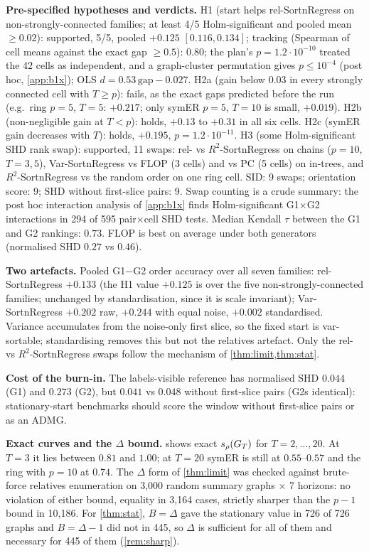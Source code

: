 \textbf{Pre-specified hypotheses and verdicts.}
H1 (start helps rel-SortnRegress on non-strongly-connected families; at least
4/5 Holm-significant and pooled mean $\ge0.02$): supported, 5/5, pooled
$+0.125$ $[0.116,0.134]$; tracking (Spearman of cell means against the exact
gap $\ge0.5$): $0.80$; the plan's $p=1.2\cdot10^{-10}$ treated the 42 cells as
independent, and a graph-cluster permutation gives $p\le10^{-4}$ (post hoc,
\cref{app:b1x}); OLS $d=0.53\,\text{gap}-0.027$.
H2a (gain below $0.03$ in every strongly connected cell with $T\ge p$): fails, as the exact gaps predicted before the run
(e.g.\ ring $p=5$, $T=5$: $+0.217$; only symER $p=5$, $T=10$ is small,
$+0.019$). H2b (non-negligible gain at $T<p$): holds, $+0.13$ to $+0.31$ in all
six cells. H2c (symER gain decreases with $T$): holds, $+0.195$,
$p=1.2\cdot10^{-11}$. H3 (some Holm-significant SHD rank swap): supported, 11
swaps: rel- vs $R^2$-SortnRegress on chains ($p=10$, $T=3,5$), Var-SortnRegress
vs FLOP (3 cells) and vs PC (5 cells) on in-trees, and $R^2$-SortnRegress vs the
random order on one ring cell. SID: 9 swaps; orientation score: 9; SHD without
first-slice pairs: 9. Swap counting is a crude summary: the post hoc
interaction analysis of \cref{app:b1x} finds Holm-significant G1$\times$G2
interactions in 294 of 595 pair$\times$cell SHD tests. Median Kendall $\tau$ between the G1 and G2 rankings:
$0.73$. FLOP is best on average under both generators (normalised SHD $0.27$
vs $0.46$).

\textbf{Two artefacts.} Pooled G1$-$G2 order accuracy over all seven
families: rel-SortnRegress $+0.133$ (the H1 value $+0.125$ is over the five
non-strongly-connected families; unchanged by standardisation, since it is scale invariant);
Var-SortnRegress $+0.202$ raw, $+0.244$ with equal noise, $+0.002$
standardised. Variance accumulates from the noise-only first slice, so the
fixed start is var-sortable; standardising removes this but not the relatives
artefact. Only the rel- vs $R^2$-SortnRegress swaps follow the mechanism of
\cref{thm:limit,thm:stat}.

\textbf{Cost of the burn-in.} The labels-visible reference has normalised SHD
$0.044$ (G1) and $0.273$ (G2), but $0.041$ vs $0.048$ without first-slice pairs
(G2s identical): stationary-start benchmarks should score the window without
first-slice pairs or as an ADMG.

\textbf{Exact curves and the $\Delta$ bound.}  shows exact
$s_\rho(G_T)$ for $T=2,\dots,20$. At $T=3$ it lies between $0.81$ and $1.00$; at
$T=20$ symER is still at $0.55$--$0.57$ and the ring with $p=10$ at $0.74$. The
$\Delta$ form of \cref{thm:limit} was checked against brute-force relatives
enumeration on 3{,}000 random summary graphs $\times$ 7 horizons: no violation
of either bound, equality in 3{,}164 cases, strictly sharper than the $p-1$
bound in 10{,}186. For \cref{thm:stat}, $B=\Delta$ gave the stationary value in
726 of 726 graphs and $B=\Delta-1$ did not in 445, so $\Delta$ is sufficient for
all of them and necessary for 445 of them (\cref{rem:sharp}).

